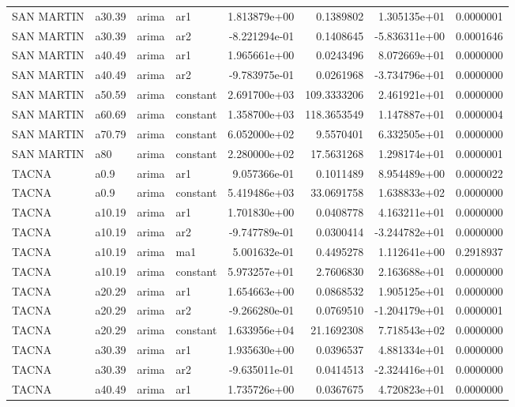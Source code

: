 \documentclass[
]{article}
\begin{document}
\begin{table}[!h]
\begin{tabular}[t]{llllrrrr}
\addlinespace
SAN MARTIN & a30.39 & arima & ar1 & 1.813879e+00 & 0.1389802 & 1.305135e+01 & 0.0000001\\
SAN MARTIN & a30.39 & arima & ar2 & -8.221294e-01 & 0.1408645 & -5.836311e+00 & 0.0001646\\
SAN MARTIN & a40.49 & arima & ar1 & 1.965661e+00 & 0.0243496 & 8.072669e+01 & 0.0000000\\
SAN MARTIN & a40.49 & arima & ar2 & -9.783975e-01 & 0.0261968 & -3.734796e+01 & 0.0000000\\
SAN MARTIN & a50.59 & arima & constant & 2.691700e+03 & 109.3333206 & 2.461921e+01 & 0.0000000\\
\addlinespace
SAN MARTIN & a60.69 & arima & constant & 1.358700e+03 & 118.3653549 & 1.147887e+01 & 0.0000004\\
SAN MARTIN & a70.79 & arima & constant & 6.052000e+02 & 9.5570401 & 6.332505e+01 & 0.0000000\\
SAN MARTIN & a80 & arima & constant & 2.280000e+02 & 17.5631268 & 1.298174e+01 & 0.0000001\\
TACNA & a0.9 & arima & ar1 & 9.057366e-01 & 0.1011489 & 8.954489e+00 & 0.0000022\\
TACNA & a0.9 & arima & constant & 5.419486e+03 & 33.0691758 & 1.638833e+02 & 0.0000000\\
\addlinespace
TACNA & a10.19 & arima & ar1 & 1.701830e+00 & 0.0408778 & 4.163211e+01 & 0.0000000\\
TACNA & a10.19 & arima & ar2 & -9.747789e-01 & 0.0300414 & -3.244782e+01 & 0.0000000\\
TACNA & a10.19 & arima & ma1 & 5.001632e-01 & 0.4495278 & 1.112641e+00 & 0.2918937\\
TACNA & a10.19 & arima & constant & 5.973257e+01 & 2.7606830 & 2.163688e+01 & 0.0000000\\
TACNA & a20.29 & arima & ar1 & 1.654663e+00 & 0.0868532 & 1.905125e+01 & 0.0000000\\
\addlinespace
TACNA & a20.29 & arima & ar2 & -9.266280e-01 & 0.0769510 & -1.204179e+01 & 0.0000001\\
TACNA & a20.29 & arima & constant & 1.633956e+04 & 21.1692308 & 7.718543e+02 & 0.0000000\\
TACNA & a30.39 & arima & ar1 & 1.935630e+00 & 0.0396537 & 4.881334e+01 & 0.0000000\\
TACNA & a30.39 & arima & ar2 & -9.635011e-01 & 0.0414513 & -2.324416e+01 & 0.0000000\\
TACNA & a40.49 & arima & ar1 & 1.735726e+00 & 0.0367675 & 4.720823e+01 & 0.0000000\\

\end{tabular}
\end{table}
\end{document}
